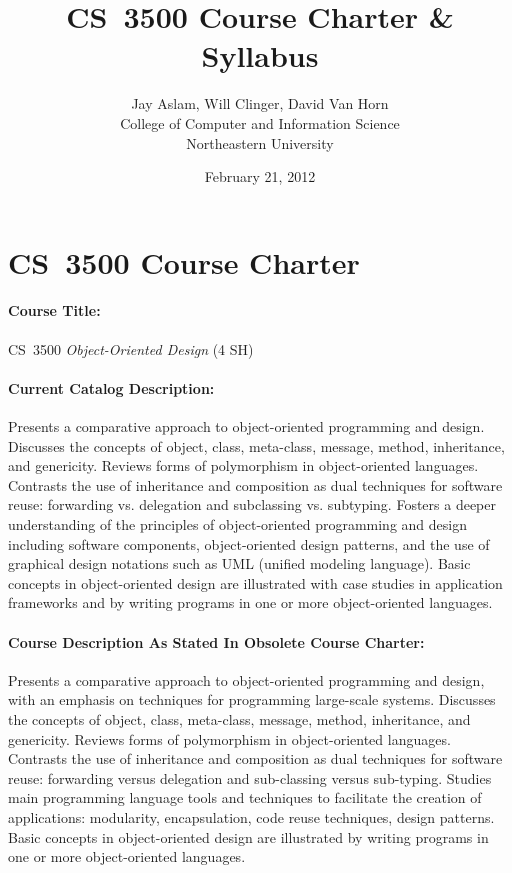 \documentclass[11pt]{article}
\title{CS~3500 Course Charter \& Syllabus}
\author{Jay Aslam, Will Clinger, David Van Horn \\
        College of Computer and Information Science \\
        Northeastern University}
\date{February 21, 2012}
\begin{document}
\maketitle

\section{CS~3500 Course Charter}

\paragraph{Course Title:}
%
CS~3500 \emph{Object-Oriented Design} (4 SH)

\paragraph{Current Catalog Description:}
%
Presents a comparative approach to object-oriented programming
and design. Discusses the concepts of object, class, meta-class,
message, method, inheritance, and genericity. Reviews forms of
polymorphism in object-oriented languages. Contrasts the use of
inheritance and composition as dual techniques for software reuse:
forwarding vs. delegation and subclassing vs. subtyping. Fosters
a deeper understanding of the principles of object-oriented
programming and design including software components,
object-oriented design patterns, and the use of graphical design
notations such as UML (unified modeling language). Basic concepts
in object-oriented design are illustrated with case studies in
application frameworks and by writing programs in one or more
object-oriented languages.

\paragraph{Course Description As Stated In Obsolete Course Charter:}
%
Presents a comparative approach to object-oriented
programming and design, with an emphasis on techniques for programming
large-scale systems. Discusses the concepts of object, class,
meta-class, message, method, inheritance, and genericity. Reviews
forms of polymorphism in object-oriented languages. Contrasts the use
of inheritance and composition as dual techniques for software reuse:
forwarding versus delegation and sub-classing versus
sub-typing. Studies main programming language tools and techniques to 
facilitate the creation of applications: modularity, encapsulation,
code reuse techniques, design patterns. Basic concepts in
object-oriented design are illustrated by writing programs in one or
more object-oriented languages. 
\end{document}
